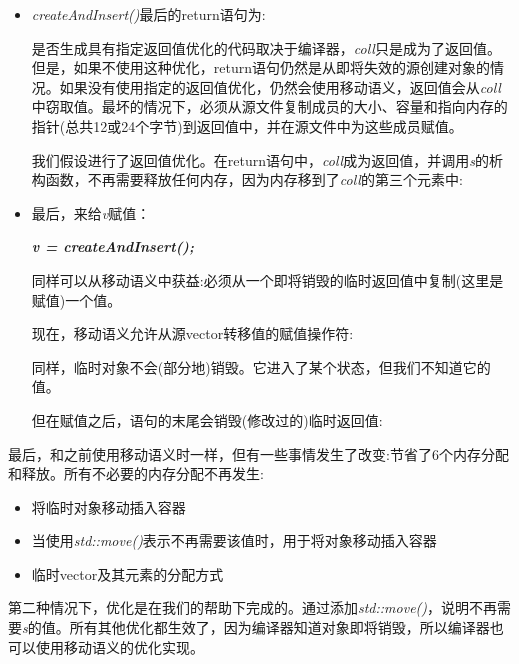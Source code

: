 \begin{itemize}
  \item \textit{createAndInsert(\allowbreak{})\allowbreak{}}最后的return语句为:\par
\begin{codebox}[cpp]
    return coll;
  }
\end{codebox}
  是否生成具有指定返回值优化的代码取决于编译器，\textit{coll}只是成为了返回值。但是，如果不使用这种优化，return语句仍然是从即将失效的源创建对象的情况。如果没有使用指定的返回值优化，仍然会使用移动语义，返回值会从\textit{coll}中窃取值。最坏的情况下，必须从源文件复制成员的大小、容量和指向内存的指针(总共12或24个字节)到返回值中，并在源文件中为这些成员赋值。\par
  我们假设进行了返回值优化。在return语句中，\textit{coll}成为返回值，并调用\textit{s}的析构函数，不再需要释放任何内存，因为内存移到了\textit{coll}的第三个元素中:\par
{}
  \item 最后，来给\textit{v}赋值：\par
  \textit{\textbf{v =\allowbreak{} createAndInsert(\allowbreak{})\allowbreak{};}}\par
  同样可以从移动语义中获益:必须从一个即将销毁的临时返回值中复制(这里是赋值)一个值。\par
  现在，移动语义允许从源vector转移值的赋值操作符:\par
{}
  同样，临时对象不会(部分地)销毁。它进入了某个状态，但我们不知道它的值。\par
  但在赋值之后，语句的末尾会销毁(修改过的)临时返回值:\par
{}
\end{itemize}

最后，和之前使用移动语义时一样，但有一些事情发生了改变:节省了6个内存分配和释放。所有不必要的内存分配不再发生:\par

\begin{itemize}
  \item 将临时对象移动插入容器
  \item 当使用\textit{std::move()}表示不再需要该值时，用于将对象移动插入容器
  \item 临时vector及其元素的分配方式
\end{itemize}

第二种情况下，优化是在我们的帮助下完成的。通过添加\textit{std::move()}，说明不再需要\textit{s}的值。所有其他优化都生效了，因为编译器知道对象即将销毁，所以编译器也可以使用移动语义的优化实现。\par

